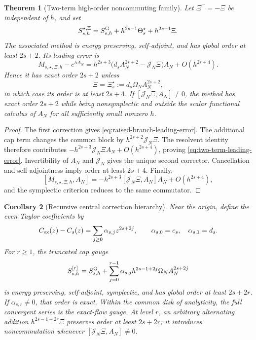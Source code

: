 \documentclass[11pt,a4paper]{article}
\newtheorem{theorem}{Theorem}[section]
\newtheorem{corollary}[theorem]{Corollary}
\begin{document}
\begin{theorem}[Two-term high-order noncommuting family]
\label{thm:two-term-gauge-hierarchy}
Let \(\Xi^\top=-\Xi\) be independent of \(h\), and set
\begin{equation}\label{eq:two-term-gauge}
 S_{s,h}^{\star,\Xi}
 =S^{\rm G}_{s,h}
 +h^{2s-1}\Theta_s^\star+h^{2s+1}\Xi.
\end{equation}
The associated method is energy preserving, self-adjoint, and has global
order at least \(2s+2\).  Its leading error is
\begin{equation}\label{eq:two-term-leading-error}
 M_{s,\star,\Xi,h}-e^{hA_N}
 =h^{2s+3}\bigl(d_sA_N^{2s+2}-\mathcal J_N\Xi\bigr)A_N
 +O(h^{2s+4}).
\end{equation}
Hence it has exact order \(2s+2\) unless
\begin{equation}\label{eq:second-central-corrector}
 \Xi=\Xi_s^\star:=d_s\Omega_NA_N^{2s+2},
\end{equation}
in which case its order is at least \(2s+4\).  If
\([\mathcal J_N\Xi,A_N]\ne0\), the method has exact order \(2s+2\)
while being nonsymplectic and outside the scalar functional calculus of
\(A_N\) for all sufficiently small nonzero \(h\).
\end{theorem}

\begin{proof}
The first correction gives \cref{eq:raised-branch-leading-error}.  The
additional cap term changes the common block by
\(h^{2s+2}\mathcal J_N\Xi\).  The resolvent identity therefore contributes
\(-h^{2s+3}\mathcal J_N\Xi A_N+O(h^{2s+4})\), proving
\cref{eq:two-term-leading-error}.  Invertibility of \(A_N\) and
\(\mathcal J_N\) gives the unique second corrector.  Cancellation and
self-adjointness imply order at least \(2s+4\).  Finally,
\[
 [M_{s,\star,\Xi,h},A_N]
 =-h^{2s+3}[\mathcal J_N\Xi,A_N]A_N+O(h^{2s+4}),
\]
and the symplectic criterion reduces to the same commutator.
\end{proof}

\begin{corollary}[Recursive central correction hierarchy]
\label{cor:recursive-gauge-hierarchy}
Near the origin, define the even Taylor coefficients by
\begin{equation}\label{eq:recursive-cayley-coefficients}
 C_{\rm ex}(z)-C_s(z)
 =\sum_{j\ge0}\alpha_{s,j}z^{2s+2j},
 \qquad \alpha_{s,0}=c_s,\quad\alpha_{s,1}=d_s.
\end{equation}
For \(r\ge1\), the truncated cap gauge
\begin{equation}\label{eq:recursive-central-gauge}
 S_{s,h}^{[r]}
 =S^{\rm G}_{s,h}
 +\sum_{j=0}^{r-1}\alpha_{s,j}
 h^{2s-1+2j}\Omega_NA_N^{2s+2j}
\end{equation}
is energy preserving, self-adjoint, symplectic, and has global order at
least \(2s+2r\).  If \(\alpha_{s,r}\ne0\), that order is exact.  Within
the common disk of analyticity, the full convergent series is the
exact-flow gauge.  At level \(r\), an arbitrary alternating addition
\(h^{2s-1+2r}\Xi\) preserves order at least \(2s+2r\); it introduces
noncommutation whenever \([\mathcal J_N\Xi,A_N]\ne0\).
\end{corollary}
\end{document}
